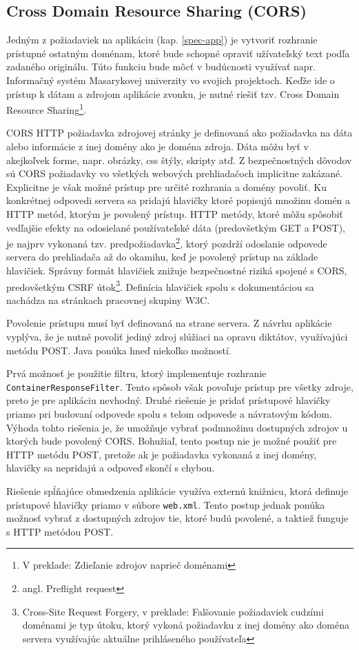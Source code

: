 \documentclass[12pt,oneside]{fithesis2}
\begin{document}
      		\subsection{Cross Domain Resource Sharing (CORS)}
      		\par Jedným z požiadaviek na aplikáciu (kap. \ref{spec-app}) je vytvoriť rozhranie prístupné ostatným doménam, ktoré bude schopné opraviť užívateľský text podľa zadaného originálu. Túto funkciu bude môcť v budúcnosti využívať napr. Informačný systém Masarykovej univerzity vo svojich projektoch. Keďže ide o prístup k dátam a zdrojom aplikácie zvonku, je nutné riešiť tzv. Cross Domain Resource Sharing\footnote{V preklade: Zdieľanie zdrojov naprieč doménami}.
      		\par CORS HTTP požiadavka zdrojovej stránky je definovaná ako požiadavka na dáta alebo informácie z inej domény ako je doména zdroja. Dáta môžu byť v akejkoľvek forme, napr. obrázky, css štýly, skripty atď. Z bezpečnostných dôvodov sú CORS požiadavky vo všetkých webových prehliadačoch implicitne zakázané. Explicitne je však možné prístup pre určité rozhrania a domény povoliť. Ku konkrétnej odpovedi servera sa pridajú hlavičky ktoré popisujú množinu domén a HTTP metód, ktorým je povolený prístup. HTTP metódy, ktoré môžu spôsobiť vedľajšie efekty na odosielané používateľské dáta (predovšetkým GET a POST), je najprv vykonaná tzv. predpožiadavka\footnote{angl. Preflight request}, ktorý pozdrží odoslanie odpovede servera do prehliadača až do okamihu, keď je povolený prístup na základe hlavičiek\cite{mozilla2015}. Správny formát hlavičiek znižuje bezpečnostné riziká spojené s CORS, predovšetkým CSRF útok\footnote{Cross-Site Request Forgery, v preklade: Falšovanie požiadaviek cudzími doménami je typ útoku, ktorý vykoná požiadavku z inej domény ako doména servera využívajúc aktuálne prihláseného používateľa}\cite{sof4}. Definícia hlavičiek spolu s dokumentáciou sa nachádza na stránkach pracovnej skupiny W3C\cite{w3c2014}.
      		\par Povolenie prístupu musí byť definovaná na strane servera. Z návrhu aplikácie vyplýva, že je nutné povoliť jediný zdroj slúžiaci na opravu diktátov, využívajúci metódu POST. Java ponúka hneď niekoľko možností.
      		\par Prvá možnosť je použitie filtru, ktorý implementuje rozhranie \texttt{ContainerResponseFilter}\cite{matei14}\cite{sof3}. Tento spôsob však povoľuje prístup pre všetky zdroje, preto je pre aplikáciu nevhodný. Druhé riešenie je pridať prístupové hlavičky priamo pri budovaní odpovede spolu s telom odpovede a návratovým kódom. Výhoda tohto riešenia je, že umožňuje vybrať podmnožinu dostupných zdrojov u ktorých bude povolený CORS. Bohužiaľ, tento postup nie je možné použiť pre HTTP metódu POST, pretože ak je požiadavka vykonaná z inej domény, hlavičky sa nepridajú a odpoveď skončí s chybou\cite{sof2}. 
      		\par Riešenie spĺňajúce obmedzenia aplikácie využíva externú knižnicu\cite{dzhuvinov15}, ktorá definuje prístupové hlavičky priamo v súbore \texttt{web.xml}. Tento postup jednak ponúka možnosť vybrať z dostupných zdrojov tie, ktoré budú povolené, a taktiež funguje s HTTP metódou POST\cite{sof2}.
\pagebreak
\end{document}

